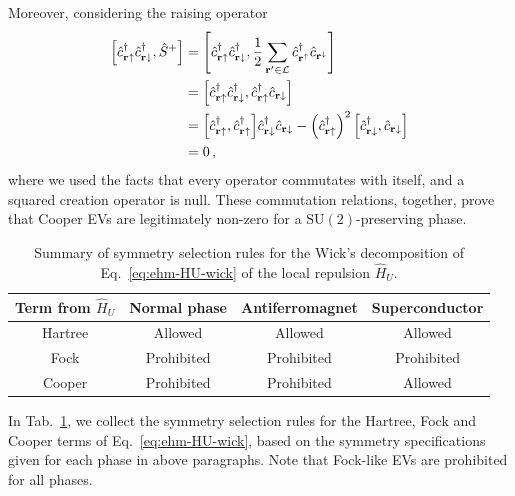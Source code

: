 \begin{tabproof}
	Moreover, considering the raising operator
	\[
	\begin{aligned}
		\comm{\hat c_{\mathbf{r}\uparrow}^\dagger \hat c_{\mathbf{r}\downarrow}^\dagger}{\hat S^+} &= \comm{\hat c_{\mathbf{r}\uparrow}^\dagger \hat c_{\mathbf{r}\downarrow}^\dagger}{\frac{1}{2} \sum_{\mathbf{r}'\in\mathcal{L}} \hat c_{\mathbf{r}^\uparrow}^\dagger \hat c_{\mathbf{r}^\downarrow}} \\
		&= \comm{\hat c_{\mathbf{r}\uparrow}^\dagger \hat c_{\mathbf{r}\downarrow}^\dagger}{\hat c_{\mathbf{r}\uparrow}^\dagger \hat c_{\mathbf{r}\downarrow}} \\
		&= \comm{\hat c_{\mathbf{r}\uparrow}^\dagger}{\hat c_{\mathbf{r}\uparrow}^\dagger} \hat c_{\mathbf{r}\downarrow}^\dagger \hat c_{\mathbf{r}\downarrow} - \left( \hat c_{\mathbf{r}\uparrow}^\dagger \right)^2 \comm{\hat c_{\mathbf{r}\downarrow}^\dagger}{\hat c_{\mathbf{r}\downarrow}} \\
		&= 0 \, ,
	\end{aligned}
	\]
	where we used the facts that every operator commutates with itself, and a squared creation operator is null. These commutation relations, together, prove that Cooper EVs are legitimately non-zero for a $\mathrm{SU}(2)$-preserving phase.

\end{tabproof}

\begin{table}
	\centering
	\begin{tabular}{c c c c}\textbf{Term from $\hat H_U$} & \textbf{Normal phase} & \textbf{Antiferromagnet} & \textbf{Superconductor} \\
		\midrule
		Hartree & Allowed & Allowed & Allowed \\
		Fock & Prohibited & Prohibited & Prohibited \\
		Cooper & Prohibited & Prohibited & Allowed \\
		\midrule
	\end{tabular}
	\caption{Summary of symmetry selection rules for the Wick's decomposition of Eq.~\eqref{eq:ehm-HU-wick} of the local repulsion $\hat H_U$.}
	\label{tab:HU-sel-rules}
\end{table}

In Tab.~\ref{tab:HU-sel-rules}, we collect the symmetry selection rules for the Hartree, Fock and Cooper terms of Eq.~\eqref{eq:ehm-HU-wick}, based on the symmetry specifications given for each phase in above paragraphs. Note that Fock-like EVs are prohibited for all phases.

